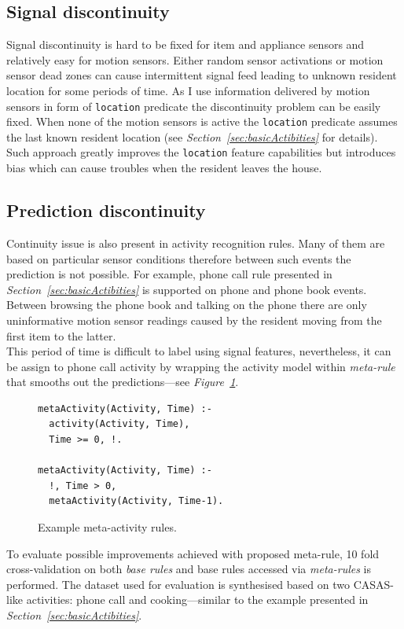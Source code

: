 \documentclass[10pt, a4paper, pdflatex, leqno, twoside, openright]{report}
\begin{document}
    \subsection{Signal discontinuity}
Signal discontinuity is hard to be fixed for item and appliance sensors and relatively easy for motion sensors. Either random sensor activations or motion sensor dead zones can cause intermittent signal feed leading to unknown resident location for some periods of time. As I use information delivered by motion sensors in form of \texttt{location} predicate the discontinuity problem can be easily fixed. When none of the motion sensors is active the \texttt{location} predicate assumes the last known resident location (see \emph{Section~\ref{sec:basicActibities}} for details). Such approach greatly improves the \texttt{location} feature capabilities but introduces bias which can cause troubles when the resident leaves the house.

    \subsection{Prediction discontinuity}
Continuity issue is also present in activity recognition rules. Many of them are based on particular sensor conditions therefore between such events the prediction is not possible. For example, phone call rule presented in \emph{Section~\ref{sec:basicActibities}} is supported on phone and phone book events. Between browsing the phone book and talking on the phone there are only uninformative motion sensor readings caused by the resident moving from the first item to the latter.\\
This period of time is difficult to label using signal features, nevertheless, it can be assign to phone call activity by wrapping the activity model within \emph{meta-rule} that smooths out the predictions---see \emph{Figure~\ref{lst:metaActivity}}.

\begin{figure}[htb]
  \begin{verbatim}
metaActivity(Activity, Time) :-
  activity(Activity, Time),
  Time >= 0, !.

metaActivity(Activity, Time) :-
  !, Time > 0,
  metaActivity(Activity, Time-1).
  \end{verbatim}
  \caption{Example meta-activity rules.\label{lst:metaActivity}}
\end{figure}

To evaluate possible improvements achieved with proposed meta-rule, 10 fold cross-validation on both \emph{base rules} and base rules accessed via \emph{meta-rules} is performed. The dataset used for evaluation is synthesised based on two CASAS-like activities: phone call and cooking---similar to the example presented in \emph{Section~\ref{sec:basicActibities}}.\\
\end{document}
